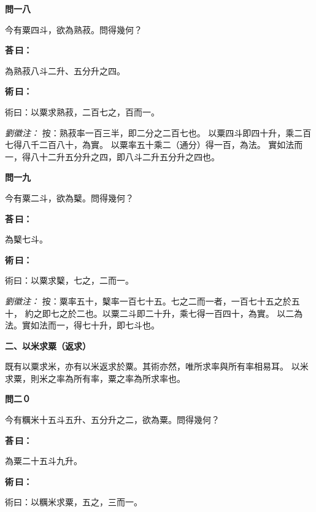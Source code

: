 \documentclass[11pt,a4paper]{article}
\newenvironment{problem}[1][]{%
  \par\vspace{0.6em}\noindent\textcolor{problemcolor}{\textbf{問\ignorespaces#1\unskip}\hspace{0.5em}}%
  \ignorespaces
}{\par\vspace{0.4em}}
\newenvironment{answer}{%
  \par\noindent\textcolor{answercolor}{\textbf{荅\,曰：}}%
  \ignorespaces
}{\par\vspace{0.3em}}
\newenvironment{method}{%
  \par\noindent\textcolor{methodcolor}{\textbf{術\,曰：}}%
  \ignorespaces
}{\par\vspace{0.4em}}
\newenvironment{liuhuicomm}{%
  \par\vspace{0.3em}\noindent\textcolor{commentarycolor}{\small\textit{劉徽注：}}}%
  {\par\vspace{0.5em}}
\begin{document}
\begin{problem}[一八]
今有粟四斗，欲為熟菽。問得幾何？
\end{problem}

\begin{answer}
為熟菽八斗二升、五分升之四。
\end{answer}

\begin{method}
術曰：以粟求熟菽，二百七之，百而一。
\end{method}

\begin{liuhuicomm}
按：熟菽率一百三半，即二分之二百七也。
以粟四斗即四十升，乘二百七得八千二百八十，為實。
以粟率五十乘二（通分）得一百，為法。
實如法而一，得八十二升五分升之四，即八斗二升五分升之四也。
\end{liuhuicomm}

\begin{problem}[一九]
今有粟二斗，欲為櫱。問得幾何？
\end{problem}

\begin{answer}
為櫱七斗。
\end{answer}

\begin{method}
術曰：以粟求櫱，七之，二而一。
\end{method}

\begin{liuhuicomm}
按：粟率五十，櫱率一百七十五。七之二而一者，一百七十五之於五十，
約之即七之於二也。以粟二斗即二十升，乘七得一百四十，為實。
以二為法。實如法而一，得七十升，即七斗也。
\end{liuhuicomm}

\vspace{0.8em}
\noindent\textbf{\large 二、以米求粟（返求）}
\vspace{0.5em}

\noindent 既有以粟求米，亦有以米返求於粟。其術亦然，唯所求率與所有率相易耳。
以米求粟，則米之率為所有率，粟之率為所求率也。

\begin{problem}[二０]
今有糲米十五斗五升、五分升之二，欲為粟。問得幾何？
\end{problem}

\begin{answer}
為粟二十五斗九升。
\end{answer}

\begin{method}
術曰：以糲米求粟，五之，三而一。
\end{method}
\end{document}
